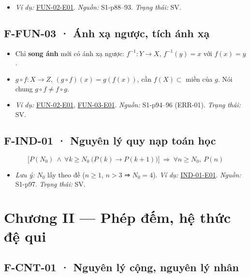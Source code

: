 \documentclass[
  10pt,
  twoside,openany]{book}
\providecommand{\tightlist}{%
  \setlength{\itemsep}{0pt}\setlength{\parskip}{0pt}}
\begin{document}
\begin{itemize}
\tightlist
\item
  \emph{Ví dụ:} \protect\hyperlink{FUN-02-E01}{FUN-02-E01}.
  \emph{Nguồn:} S1-p88--93. \emph{Trạng thái:} SV.
\end{itemize}

\hypertarget{F-FUN-03}{%
\subsection{F-FUN-03 · Ánh xạ ngược, tích ánh xạ}\label{F-FUN-03}}

\begin{itemize}
\tightlist
\item
  Chỉ \textbf{song ánh} mới có ánh xạ ngược: \(f^{-1}:Y\to X\),
  \(f^{-1}(y)=x\) với \(f(x)=y\).
\item
  \(g\circ f:X\to Z\), \((g\circ f)(x)=g(f(x))\), cần \(f(X)\subset\)
  miền của \(g\). Nói chung \(g\circ f\ne f\circ g\).
\item
  \emph{Ví dụ:} \protect\hyperlink{FUN-02-E01}{FUN-02-E01},
  \protect\hyperlink{FUN-03-E01}{FUN-03-E01}. \emph{Nguồn:} S1-p94--96
  (ERR-01). \emph{Trạng thái:} SV.
\end{itemize}

\hypertarget{F-IND-01}{%
\subsection{F-IND-01 · Nguyên lý quy nạp toán học}\label{F-IND-01}}

\[
\Big[P(N_0)\ \wedge\ \forall k\ge N_0\ \big(P(k)\to P(k+1)\big)\Big]\ \Longrightarrow\ \forall n\ge N_0,\ P(n)
\]

\begin{itemize}
\tightlist
\item
  \emph{Lưu ý:} \(N_0\) lấy theo đề (\(n\ge1\), \(n>3\) ⇒ \(N_0=4\)).
  \emph{Ví dụ:} \protect\hyperlink{IND-01-E01}{IND-01-E01}.
  \emph{Nguồn:} S1-p97. \emph{Trạng thái:} SV.
\end{itemize}

\hypertarget{chux1b0ux1a1ng-ii-phuxe9p-ux111ux1ebfm-hux1ec7-thux1ee9c-ux111ux1ec7-qui}{%
\section{Chương II --- Phép đếm, hệ thức đệ
qui}\label{chux1b0ux1a1ng-ii-phuxe9p-ux111ux1ebfm-hux1ec7-thux1ee9c-ux111ux1ec7-qui}}

\hypertarget{F-CNT-01}{%
\subsection{F-CNT-01 · Nguyên lý cộng, nguyên lý nhân}\label{F-CNT-01}}
\end{document}

